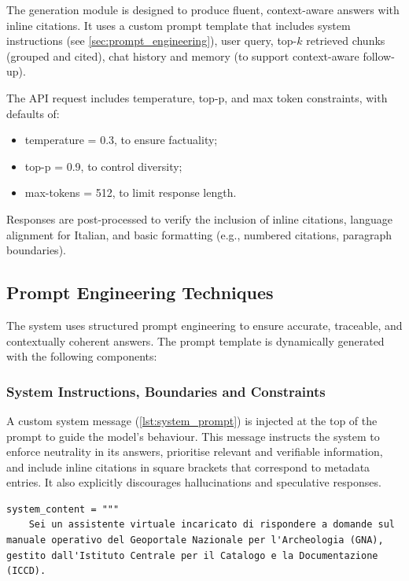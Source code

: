 \begin{spacing}{1.5}
The generation module is designed to produce fluent, context-aware answers with inline citations. It uses a custom prompt template that includes system instructions (see \autoref{sec:prompt_engineering}), user query, top-$k$ retrieved chunks (grouped and cited), chat history and memory (to support context-aware follow-up).

The API request includes temperature, top-p, and max token constraints, with defaults of:
\begin{itemize}
      \item temperature = 0.3, to ensure factuality;
      \item top-p = 0.9, to control diversity;
      \item max-tokens = 512, to limit response length.
\end{itemize}

Responses are post-processed to verify the inclusion of inline citations, language alignment for Italian, and basic formatting (e.g., numbered citations, paragraph boundaries).

\subsection{Prompt Engineering Techniques} \label{sec:prompt_engineering}
The system uses structured prompt engineering to ensure accurate, traceable, and contextually coherent answers. The prompt template is dynamically generated with the following components:

\noindent\subsubsection*{\large System Instructions, Boundaries and Constraints}
A custom system message (\autoref{lst:system_prompt}) is injected at the top of the prompt to guide the model’s behaviour. This message instructs the system to enforce neutrality in its answers, prioritise relevant and verifiable information, and include inline citations in square brackets that correspond to metadata entries. It also explicitly discourages hallucinations and speculative responses.

\vspace{0.6em}
\begin{lstlisting}[breaklines=true,
                  frame=none,
                   caption={System prompt specifying assistant constraints and response instructions.},
                   captionpos=b,
                   label={lst:system_prompt},
  xleftmargin=0.05\textwidth,
  xrightmargin=0.05\textwidth]
system_content = """
    Sei un assistente virtuale incaricato di rispondere a domande sul manuale operativo del Geoportale Nazionale per l'Archeologia (GNA), gestito dall'Istituto Centrale per il Catalogo e la Documentazione (ICCD).


\end{lstlisting}
\end{spacing}
